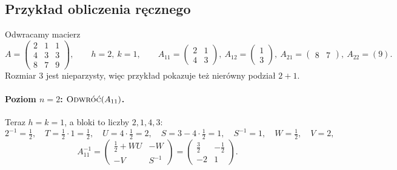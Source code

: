 \subsection{Przykład obliczenia ręcznego}
Odwracamy macierz
\[
A=\begin{pmatrix}2&1&1\\4&3&3\\8&7&9\end{pmatrix},\qquad
h=2,\ k=1,\qquad
A_{11}=\begin{pmatrix}2&1\\4&3\end{pmatrix},\ A_{12}=\begin{pmatrix}1\\3\end{pmatrix},\ A_{21}=\begin{pmatrix}8&7\end{pmatrix},\ A_{22}=(9).
\]
Rozmiar 3 jest nieparzysty, więc przykład pokazuje też nierówny podział $2+1$.

\paragraph{Poziom $n=2$: $\Odwroc(A_{11})$.} Teraz $h=k=1$, a bloki to liczby $2,1,4,3$:
\[
2^{-1}=\tfrac12,\quad T=\tfrac12\cdot1=\tfrac12,\quad U=4\cdot\tfrac12=2,\quad S=3-4\cdot\tfrac12=1,\quad S^{-1}=1,\quad
W=\tfrac12,\quad V=2,
\]
\[
A_{11}^{-1}=\begin{pmatrix}\frac12+W U&-W\\-V&S^{-1}\end{pmatrix}=\begin{pmatrix}\frac32&-\frac12\\-2&1\end{pmatrix}.
\]

